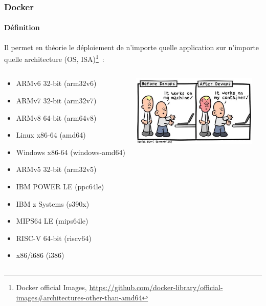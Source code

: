 \documentclass{beamer}
\begin{document}
    \begin{frame}
        \transdissolve
        \frametitle{Docker}
        \framesubtitle{Définition}
        Il permet en théorie le déploiement de n'importe quelle application sur n'importe quelle architecture (OS, ISA)\footnote{Docker official Images, \url{https://github.com/docker-library/official-images\#architectures-other-than-amd64}}~:
        \bigbreak
        \begin{columns}
            \begin{scriptsize}
                \begin{itemize}
                    \item ARMv6 32-bit (arm32v6)
                    \item ARMv7 32-bit (arm32v7)
                    \item ARMv8 64-bit (arm64v8)
                    \item Linux x86-64 (amd64)
                    \item Windows x86-64 (windows-amd64)
                    \item ARMv5 32-bit (arm32v5)
                    \item IBM POWER LE (ppc64le)
                    \item IBM z Systems (s390x)
                    \item MIPS64 LE (mips64le)
                    \item RISC-V 64-bit (riscv64)
                    \item x86/i686 (i386)
                \end{itemize}
            \end{scriptsize}
            \centering
            \includegraphics[width=6cm]{image/it-works.png}
        \end{columns}
    \end{frame}
\end{document}
